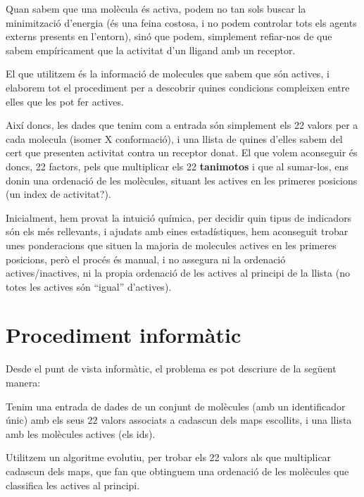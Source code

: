 \documentclass[titlepage,a4paper,12pt]{book}
\begin{document}

Quan sabem que una molècula és activa, podem no tan sols buscar la minimització
d'energia (és una feina costosa, i no podem controlar tots els agents externs
presents en l'entorn), sinó que podem, simplement refiar-nos de que sabem
empíricament que la activitat d'un lligand amb un receptor.



El que utilitzem és la informació de molecules que sabem que són actives,
i elaborem tot el procediment per a descobrir quines condicions compleixen entre
elles que les pot fer actives.

Així doncs, les dades que tenim com a entrada són simplement els 22 valors per a
cada molecula (isomer X conformació), i una llista de quines d'elles sabem del
cert que presenten activitat contra un receptor donat.  El que volem aconseguir
és doncs, 22 factors, pels que multiplicar els 22 \textbf{tanimotos} i que al
sumar-los, ens donin una ordenació de les molècules, situant les actives en
les primeres posicions (un index de activitat?).


Inicialment, hem provat la intuició química, per decidir quin tipus de
indicadors són els més rellevants, i ajudats amb eines estadístiques, hem
aconseguit trobar unes ponderacions que situen la majoria de molecules actives
en les primeres posicions, però el procés és manual, i no assegura ni la
ordenació actives/inactives, ni la propia ordenació de les actives al principi
de la llista (no totes les actives són ``igual'' d'actives).


\section{Procediment informàtic} %
\label{sec:Procediment informatic}

Desde el punt de vista informàtic, el problema es pot descriure de la següent
manera:

Tenim una entrada de dades de un conjunt de molècules (amb un identificador
únic) amb els seus 22 valors associats a cadascun dels maps escollits, i una
llista amb les molècules actives (els ids).

Utilitzem un algoritme evolutiu, per trobar els 22 valors als que multiplicar
cadascun dels maps, que fan que obtinguem una ordenació de les molècules que
classifica les actives al principi.
\end{document}
